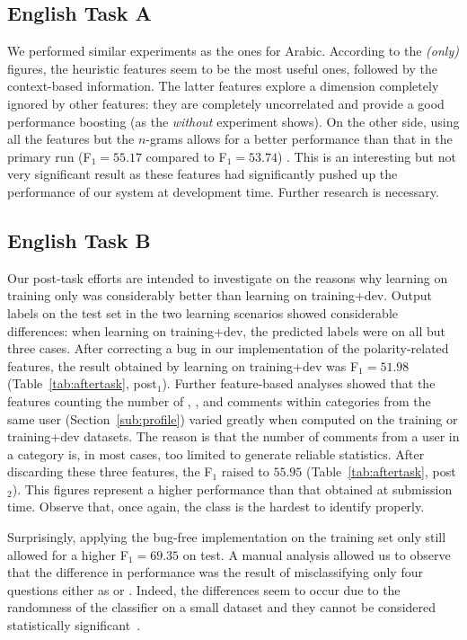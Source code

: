 \subsection{English Task A} \label{sec:discussiona}

We performed similar experiments as the ones for Arabic. According to the 
\textit{(only)} figures, the heuristic features seem to be the most useful ones, 
followed by the context-based information. The latter features explore a 
dimension completely ignored by other features:  they are completely 
uncorrelated and provide a good performance boosting (as the \textit{without} 
experiment shows). On the other side, using all the features but the $n$-grams 
allows for a better performance than that in the primary run (F$_1=55.17$ 
compared to F$_1=53.74$) . This is an interesting but not very significant 
result as these features had significantly pushed up the performance of our 
system at development time. Further research is necessary.
  
\subsection{English Task B} \label{sec:discussionb}

Our post-task efforts are intended to investigate on the reasons why learning on 
training only was considerably better than learning on training+dev. Output 
labels on the test set in the two learning scenarios showed considerable 
differences: when learning on training+dev, the predicted labels were \yes on 
all but three cases. After correcting a bug in our implementation of the 
polarity-related features, the result obtained by learning on training+dev was 
F$_1=51.98$ (Table~\ref{tab:aftertask}, post$_1$). Further feature-based 
analyses showed that the features counting the number of \good, \bad, and \pot 
comments within categories from the same user (\cf Section~\ref{sub:profile}) 
varied greatly when computed on the training or training+dev datasets. The 
reason is that the number of comments from a user in a category is, in most 
cases, too limited to generate reliable statistics. After discarding these three 
features, the F$_1$ raised to $55.95$ (Table~\ref{tab:aftertask}, post$_2$). 
This figures represent a higher performance than that obtained at submission 
time. Observe that, once again, the \unsure class is the hardest to identify 
properly.

Surprisingly, applying the bug-free implementation on the training set only 
still allowed for a higher F$_1 =69.35$ on test. A manual analysis allowed us 
to observe that the difference in performance was the result of misclassifying 
only four questions either as \yes or \unsure. Indeed, the differences seem to 
occur due to the randomness of the classifier on a small dataset and they 
cannot be considered statistically 
significant~\cite{Marquez-EtAl:2015:SemEval}. 

